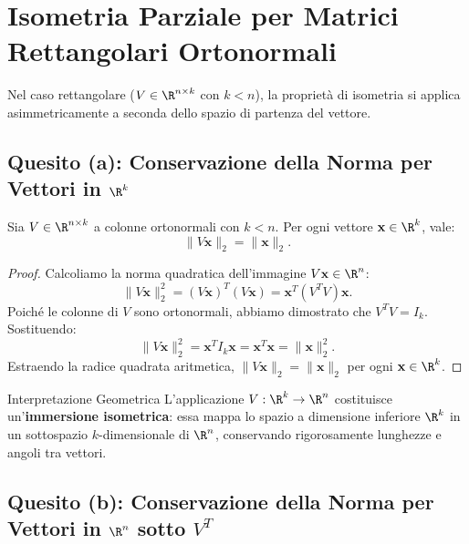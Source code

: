\FloatBarrier
\section{Isometria Parziale per Matrici Rettangolari Ortonormali}

Nel caso rettangolare ($V \in \R^{n \times k}$ con $k < n$), la propriet\`a di isometria si applica asimmetricamente a seconda dello spazio di partenza del vettore.

\subsection{Quesito (a): Conservazione della Norma per Vettori in \texorpdfstring{$\R^k$}{R\textasciicircum k}}

\begin{proposition}
\label{prop:isometria-destra}
Sia $V \in \R^{n \times k}$ a colonne ortonormali con $k < n$. Per ogni vettore $\mathbf{x} \in \R^k$, vale:
\begin{equation}
    \|V\mathbf{x}\|_2 = \|\mathbf{x}\|_2.
\end{equation}
\end{proposition}

\begin{proof}
Calcoliamo la norma quadratica dell'immagine $V\mathbf{x} \in \R^n$:
\begin{equation}
    \|V\mathbf{x}\|_2^2 = (V\mathbf{x})^T (V\mathbf{x}) = \mathbf{x}^T (V^T V) \mathbf{x}.
\end{equation}
Poich\'e le colonne di $V$ sono ortonormali, abbiamo dimostrato che $V^T V = I_k$. Sostituendo:
\begin{equation}
    \|V\mathbf{x}\|_2^2 = \mathbf{x}^T I_k \mathbf{x} = \mathbf{x}^T \mathbf{x} = \|\mathbf{x}\|_2^2.
\end{equation}
Estraendo la radice quadrata aritmetica, $\|V\mathbf{x}\|_2 = \|\mathbf{x}\|_2$ per ogni $\mathbf{x} \in \R^k$.
\end{proof}

\begin{noteblock}{Interpretazione Geometrica}
L'applicazione $V: \R^k \to \R^n$ costituisce un'\textbf{immersione isometrica}: essa mappa lo spazio a dimensione inferiore $\R^k$ in un sottospazio $k$-dimensionale di $\R^n$, conservando rigorosamente lunghezze e angoli tra vettori.
\end{noteblock}

\subsection{Quesito (b): Conservazione della Norma per Vettori in \texorpdfstring{$\R^n$}{R\textasciicircum n} sotto \texorpdfstring{$V^T$}{V\textasciicircum T}}

